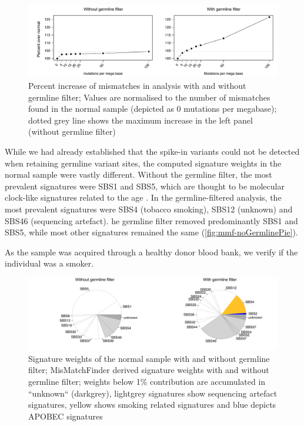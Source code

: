 \begin{figure}[ht]
\centering
\includegraphics[width=.99\linewidth]{Figures/MisMatchFinder/spikeInPercentage.pdf}
\caption[Percent increase of mismatches in analysis with and without germline filter]{Percent increase of mismatches in analysis with and without germline filter; Values are normalised to the number of mismatches found in the normal sample (depicted as \num{0} mutations per megabase); dotted grey line shows the maximum increase in the left panel (without germline filter)}\label{fig:mmf-percentIncrease}
\end{figure}

While we had already established that the spike-in variants could not be detected when retaining germline variant sites, the computed signature weights in the normal sample were vastly different. Without the germline filter, the most prevalent signatures were SBS1 and SBS5, which are thought to be molecular clock-like signatures related to the  age \cite{Alexandrov2020}. In the germline-filtered analysis, the most prevalent signatures were SBS4 (tobacco smoking), SBS12 (unknown) and SBS46 (sequencing artefact). he germline filter removed predominantly SBS1 and SBS5, while most other signatures remained the same (\autoref{fig:mmf-noGermlinePie}).

As the sample was acquired through a healthy donor blood bank, we  verify if the individual was a smoker.

\begin{figure}[ht]
\centering
\includegraphics[width=.99\linewidth]{Figures/MisMatchFinder/noGermlineFilterSignaturesPieChart.pdf}
\caption[Signature weights of the normal sample with and without germline filter]{Signature weights of the normal sample with and without germline filter; MisMatchFinder derived signature weights with and without germline filter; weights below 1\% contribution are accumulated in ``unknown`` (darkgrey), lightgrey signatures show sequencing artefact signatures, yellow shows smoking related signatures and blue depicts APOBEC signatures}\label{fig:mmf-noGermlinePie}
\end{figure}
 
